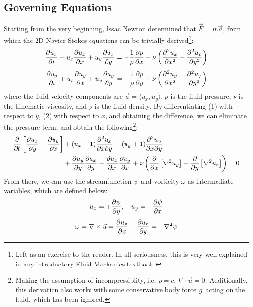 \documentclass[12pt, reqno]{amsart}
\begin{document}
\subsection{Governing Equations}
Starting from the very beginning, Issac Newton determined that $\vec{F} = m \vec{a}$, from which the 2D Navier-Stokes equations can be trivially derived\footnote{Left as an exercise to the reader. In all seriousness, this is very well explained in any introductory Fluid Mechanics textbook.}:
\begin{equation}
    \pdv{u_x}{t} + u_x \pdv{u_x}{x} + u_y \pdv{u_x}{y} = - \frac{1}{\rho} \pdv{p}{x} + \nu \left( \pdv[2]{u_x}{x} + \pdv[2]{u_x}{y} \right)
\end{equation}
\begin{equation}
    \pdv{u_y}{t} + u_x \pdv{u_y}{x} + u_y \pdv{u_y}{y} = - \frac{1}{\rho} \pdv{p}{y} + \nu \left( \pdv[2]{u_y}{x} + \pdv[2]{u_y}{y} \right)
\end{equation}
where the fluid velocity components are $\vec{u} = \langle u_x, u_y \rangle$, $p$ is the fluid pressure, $\nu$ is the kinematic viscosity, and $\rho$ is the fluid density. By differentiating (1) with respect to $y$, (2) with respect to $x$, and obtaining the difference, we can eliminate the pressure term, and obtain the following\footnote{Making the assumption of incompressiblity, i.e. $\rho = c$, $\nabla \cdot \vec{u} = 0$. Additionally, this derivation also works with some conservative body force $\vec{g}$ acting on the fluid, which has been ignored.}:
\begin{equation}
    \begin{aligned}
    \pdv{}{t} \left[ \pdv{u_x}{y} - \pdv{u_y}{x} \right] &+ (u_x + 1) \frac{\partial^2 u_x}{\partial x \partial y} - (u_y + 1) \frac{\partial^2 u_y}{\partial x \partial y} \\
    & + \pdv{u_y}{y} \pdv{u_x}{y} - \pdv{u_x}{x} \pdv{u_y}{x} + \nu \left( \pdv{}{x} \left[ \nabla^2 u_y \right] - \pdv{}{y} \left[ \nabla^2 u_x \right] \right) = 0
    \end{aligned}
\end{equation}
From there, we can use the streamfunction $\psi$ and vorticity $\omega$ as intermediate variables, which are defined below:
\begin{equation}
    u_x = + \pdv{\psi}{y}, \quad u_y = - \pdv{\psi}{x}
\end{equation}
\begin{equation}
    \omega = \nabla \times \vec{u} = \pdv{u_y}{x} - \pdv{u_x}{y} = - \nabla^2 \psi
\end{equation}
\end{document}
